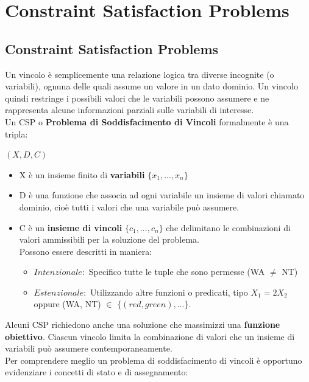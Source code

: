 \chapter{Constraint Satisfaction Problems} \label{ch:Costraint Satisfaction
    Problems}
\section{Constraint Satisfaction Problems}
Un vincolo è semplicemente una relazione logica tra diverse incognite (o
variabili), ognuna delle quali assume un valore in un dato dominio. Un vincolo
quindi restringe i possibili valori che le variabili possono assumere e ne
rappresenta alcune informazioni parziali sulle variabili di interesse.
\vspace{0.5cm}
\\Un CSP o \textbf{Problema di Soddisfacimento di Vincoli} formalmente è una
tripla:
\begin{center}
    $(X, D, C)$
\end{center}
\begin{itemize}
    \item X è un insieme finito di \textbf{variabili} $\{x_1, ..., x_n\}$
    \item D è una funzione che associa ad ogni variabile un insieme di valori
          chiamato dominio, cioè tutti i valori che una variabile può assumere.
    \item C è un \textbf{insieme di vincoli}  $\{c_1, ..., c_n\}$ che delimitano
          le combinazioni di valori ammissibili per la soluzione del problema.
          \\Possono essere descritti in maniera:
          \begin{itemize}
              \item $Intenzionale:$ Specifico tutte le tuple che sono permesse
                    (WA $\neq$ NT)
              \item $Estenzionale:$ Utilizzando altre funzioni o predicati, tipo
                    $X_1 = 2X_2$ oppure (WA, NT) $\in$ $\{(red, green), ...\}$.
          \end{itemize}
\end{itemize}
\noindent Alcuni CSP richiedono anche una soluzione che massimizzi una
\textbf{funzione obiettivo}. Ciascun vincolo limita la combinazione di valori
che un insieme di variabili può assumere contemporaneamente. \\
Per comprendere meglio un problema di soddisfacimento di vincoli è opportuno
evidenziare i concetti di stato e di assegnamento:
